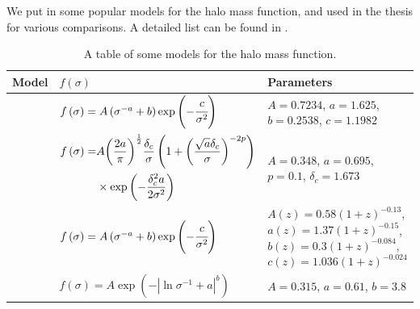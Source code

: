 We put in  some popular models for the halo mass function,
and used in the thesis for various comparisons. A detailed list can be found in
\citet{Murray+13}.
%
\begin{table}[htb]
    \centering
    \caption{A table of some models for the halo mass
    function.\label{tab:hmf}}
    \begin{tabular}{cp{6.5cm}p{5cm}}
        \toprule
        Model & $f \left(\sigma\right)$ & Parameters\\
        \midrule
        \citet{Warren+06} &
        $f\left(\sigma\right)=
        A\left(\sigma^{-a}+b\right)\exp\left(-\cfrac{c}{\sigma^2}\right)$ &
        $A=0.7234$, \newline
        $a=1.625$, \newline
        $b=0.2538$, \newline
        $c=1.1982$
        \\
        \citet{Courtin+11} &
        $\begin{aligned}
                f\left(\sigma\right)=&
                A{\left(\frac{2a}{\pi}\right)}^\undemi%
                \frac{\delta_c}{\sigma}\left(1+
                {\left(\frac{\sqrt{a}\delta_c}{\sigma}\right)}^{-2p}\right)\nonumber\\
                &
                \times\exp\left(-\frac{\delta_c^2{a}}{2\sigma^2}\right)\nonumber%
        \end{aligned}$ &
        $A=0.348$, \newline
        $a=0.695$, \newline
        $p=0.1$, \newline
        $\delta_c=1.673$ \\
        \citet{Crocce+10} &
        $f\left(\sigma\right)=
        A\left(\sigma^{-a}+b\right)\exp\left(-\cfrac{c}{\sigma^2}\right)$ &
        $A\left(z\right)=0.58{\left(1+z\right)}^{-0.13}$,\newline
        $a\left(z\right)=1.37{\left(1+z\right)}^{-0.15}$,\newline
        $b\left(z\right)=0.3{\left(1+z\right)}^{-0.084}$,\newline
        $c\left(z\right)=1.036{\left(1+z\right)}^{-0.024}$
        \\
        \citet{Jenkins+01} &
        $f\left(\sigma\right)=
        A\exp\left(-\left|\ln\sigma^{-1}+a\right|^b\right)$ &
        $A=0.315$, \newline
        $a=0.61$, \newline
        $b=3.8$ \\

\end{tabular}
\end{table}
